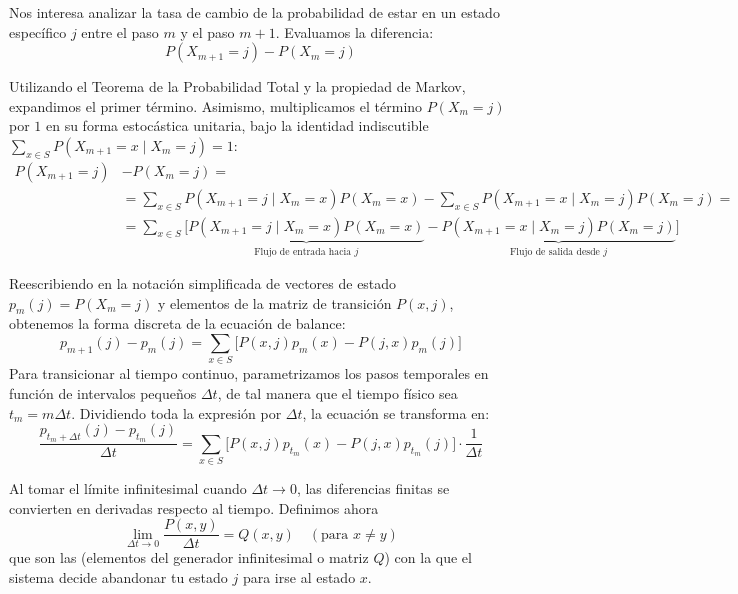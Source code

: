 \noindent
Nos interesa analizar la tasa de cambio de la probabilidad de estar en un estado específico $j$ entre el paso $m$ y el paso $m+1$. Evaluamos la diferencia:
\begin{equation*}
    P(X_{m+1} = j) - P(X_m = j)
\end{equation*}

\noindent Utilizando el Teorema de la Probabilidad Total y la propiedad de Markov, expandimos el primer término. Asimismo, multiplicamos el término $P(X_m = j)$ por $1$ en su forma estocástica unitaria, bajo la identidad indiscutible $\sum\limits_{x \in S} P(X_{m+1} = x \mid X_m = j) = 1$:
\begin{align*}
    P(X_{m+1} = j) &- P(X_m = j) = \\
    &= \sum_{x \in S} P(X_{m+1} = j \mid X_m = x)P(X_m = x) - \sum_{x \in S} P(X_{m+1} = x \mid X_m = j)P(X_m = j)= \\
    &= \sum_{x \in S} \Big[ \underbrace{P(X_{m+1} = j \mid X_m = x)P(X_m = x)}_{\text{Flujo de entrada hacia } j} - \underbrace{P(X_{m+1} = x \mid X_m = j)P(X_m = j)}_{\text{Flujo de salida desde } j} \Big]
\end{align*}

\noindent Reescribiendo en la notación simplificada de vectores de estado $p_m(j) = P(X_m = j)$ y elementos de la matriz de transición $P(x,j)$, obtenemos la forma discreta de la ecuación de balance:
\begin{equation*}
    p_{m+1}(j) - p_m(j) = \sum_{x \in S} \big[ P(x, j) p_m(x) - P(j, x) p_m(j) \big]
\end{equation*}
Para transicionar al tiempo continuo, parametrizamos los pasos temporales en función de intervalos pequeños $\Delta t$, de tal manera que el tiempo físico sea $t_m = m \Delta t$. Dividiendo toda la expresión por $\Delta t$, la ecuación se transforma en:
\begin{equation*}
    \frac{p_{t_m + \Delta t}(j) - p_{t_m}(j)}{\Delta t} = \sum_{x \in S} \big[ P(x, j) p_{t_m}(x) - P(j, x) p_{t_m}(j) \big] \cdot \frac{1}{\Delta t}
\end{equation*}

\noindent Al tomar el límite infinitesimal cuando $\Delta t \to 0$, las diferencias finitas se convierten en derivadas respecto al tiempo. Definimos ahora
\begin{equation*}
    \lim_{\Delta t \to 0} \frac{P(x, y)}{\Delta t} = Q(x, y) \quad (\text{para } x \neq y)
\end{equation*}
que son las  (elementos del generador infinitesimal o matriz $Q$) con la que el sistema decide abandonar tu estado $j$ para irse al estado $x$. \\

